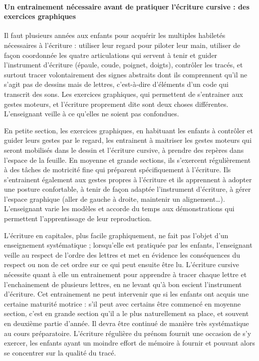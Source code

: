 \paragraph{Un entrainement nécessaire avant de pratiquer l’écriture cursive : des exercices graphiques}
Il faut plusieurs années aux enfants pour acquérir les multiples habiletés nécessaires à l’écriture : utiliser leur regard pour piloter leur main, utiliser de façon coordonnée les quatre articulations qui servent à tenir et guider l’instrument d’écriture (épaule, coude, poignet, doigts), contrôler les tracés, et surtout tracer volontairement des signes abstraits dont ils comprennent qu’il ne s’agit pas de dessins mais de lettres, c’est-à-dire d’éléments d’un code qui transcrit des sons. Les exercices graphiques, qui permettent de s’entrainer aux gestes moteurs, et l’écriture proprement dite sont deux choses différentes. L’enseignant veille à ce qu’elles ne soient pas confondues.

En petite section, les exercices graphiques, en habituant les enfants à contrôler et guider leurs gestes par le regard, les entrainent à maitriser les gestes moteurs qui seront mobilisés dans le dessin et l’écriture cursive, à prendre des repères dans l’espace de la feuille. En moyenne et grande sections, ils s’exercent régulièrement à des tâches de motricité fine qui préparent spécifiquement à l’écriture. Ils s’entrainent également aux gestes propres à l’écriture et ils apprennent à adopter une posture confortable, à tenir de façon adaptée l’instrument d’écriture, à gérer l’espace graphique (aller de gauche à droite, maintenir un alignement\dots). L’enseignant varie les modèles et accorde du temps aux démonstrations qui permettent l’apprentissage de leur reproduction. 

L’écriture en capitales, plus facile graphiquement, ne fait pas l’objet d’un enseignement systématique ; lorsqu’elle est pratiquée par les enfants, l’enseignant veille au respect de l’ordre des lettres et met en évidence les conséquences du respect ou non de cet ordre sur ce qui peut ensuite être lu. L’écriture cursive nécessite quant à elle un entrainement pour apprendre à tracer chaque lettre et l’enchainement de plusieurs lettres, en ne levant qu’à bon escient l’instrument d’écriture. Cet entrainement ne peut intervenir que si les enfants ont acquis une certaine maturité motrice : s’il peut avec certains être commencé en moyenne section, c’est en grande section qu’il a le plus naturellement sa place, et souvent en deuxième partie d’année. Il devra être continué de manière très systématique au cours préparatoire. L’écriture régulière du prénom fournit une occasion de s’y exercer, les enfants ayant un moindre effort de mémoire à fournir et pouvant alors se concentrer sur la qualité du tracé. 

